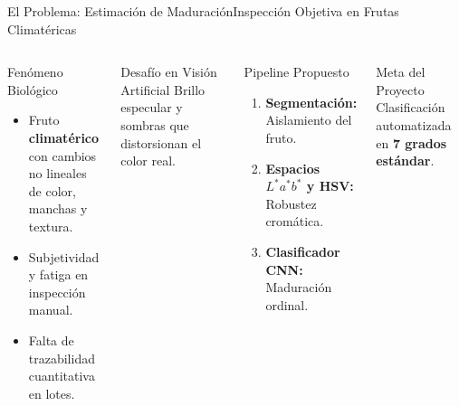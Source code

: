 \documentclass[aspectratio=169, 10pt]{beamer}
\begin{document}
\begin{frame}{El Problema: Estimación de Maduración}{Inspección Objetiva en Frutas Climatéricas}
    \begin{columns}[T]
        \begin{block}{Fenómeno Biológico}
            \begin{itemize}
                \item Fruto \textbf{climatérico} con cambios no lineales de color, manchas y textura.
                \item Subjetividad y fatiga en inspección manual.
                \item Falta de trazabilidad cuantitativa en lotes.
            \end{itemize}
        \end{block}

        \vspace{0.1cm}
        \begin{alertblock}{Desafío en Visión Artificial}
            Brillo especular y sombras que distorsionan el color real.
        \end{alertblock}

        \begin{exampleblock}{Pipeline Propuesto}
            \begin{enumerate}
                \item \textbf{Segmentación:} Aislamiento del fruto.
                \item \textbf{Espacios $L^*a^*b^*$ y HSV:} Robustez cromática.
                \item \textbf{Clasificador CNN:} Maduración ordinal.
            \end{enumerate}
        \end{exampleblock}

        \vspace{0.1cm}
        \begin{goldblock}{Meta del Proyecto}
            Clasificación automatizada en \textbf{7 grados estándar}.
        \end{goldblock}
    \end{columns}
\end{frame}
\end{document}

